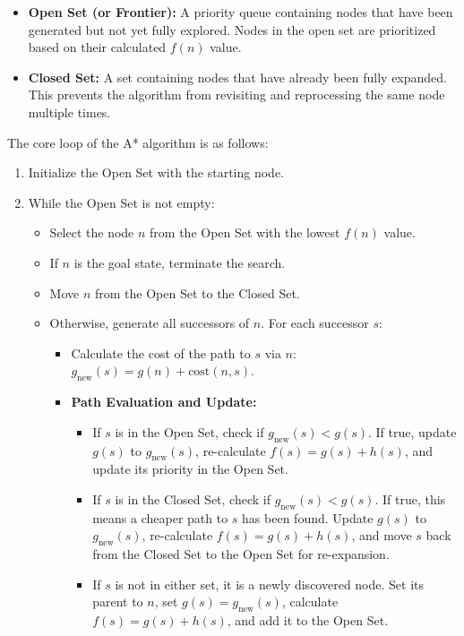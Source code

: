 \begin{itemize}
    \item \textbf{Open Set (or Frontier):} A priority queue containing nodes that have been generated but not yet fully explored. Nodes in the open set are prioritized based on their calculated $f(n)$ value.
    \item \textbf{Closed Set:} A set containing nodes that have already been fully expanded. This prevents the algorithm from revisiting and reprocessing the same node multiple times.
\end{itemize}

The core loop of the A* algorithm is as follows:
\begin{enumerate}
    \item Initialize the Open Set with the starting node.
    \item While the Open Set is not empty:
    \begin{itemize}
        \item Select the node $n$ from the Open Set with the lowest $f(n)$ value.
        \item If $n$ is the goal state, terminate the search.
        \item Move $n$ from the Open Set to the Closed Set.
        \item Otherwise, generate all successors of $n$. For each successor $s$:
        \begin{itemize}
            \item Calculate the cost of the path to $s$ via $n$: $g_{\text{new}}(s) = g(n) + \text{cost}(n, s)$.
            \item \textbf{Path Evaluation and Update:}
            \begin{itemize}
                \item If $s$ is in the Open Set, check if $g_{\text{new}}(s) < g(s)$. If true, update $g(s)$ to $g_{\text{new}}(s)$, re-calculate $f(s) = g(s) + h(s)$, and update its priority in the Open Set.
                \item If $s$ is in the Closed Set, check if $g_{\text{new}}(s) < g(s)$. If true, this means a cheaper path to $s$ has been found. Update $g(s)$ to $g_{\text{new}}(s)$, re-calculate $f(s) = g(s) + h(s)$, and move $s$ back from the Closed Set to the Open Set for re-expansion.
                \item If $s$ is not in either set, it is a newly discovered node. Set its parent to $n$, set $g(s) = g_{\text{new}}(s)$, calculate $f(s) = g(s) + h(s)$, and add it to the Open Set.
            \end{itemize}
        \end{itemize}
    \end{itemize}
\end{enumerate}
